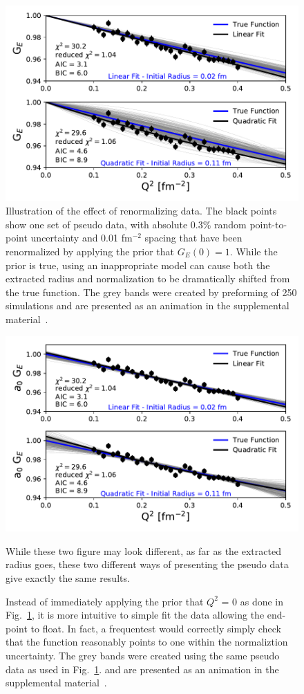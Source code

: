 \documentclass[10pt,superscriptaddress,aps,prc,twocolumn]{revtex4-1}
\begin{document}
\begin{figure}[htb]
\includegraphics[width=\columnwidth]{Figure/linearVSquadratic-band.pdf}
\caption{Illustration of the effect of renormalizing data.  The
black points show one set of pseudo data, with absolute 0.3\% random point-to-point 
uncertainty and 0.01 fm$^{-2}$ spacing that have been renormalized
by applying the prior that $G_E(0)=1$.    While the prior is true, using an inappropriate model
can cause both the extracted radius and normalization to be dramatically shifted from the true
function.   
The grey bands were created by preforming of 250 simulations and are presented as
an animation in the supplemental material~\cite{Supplement}.}
\label{linearVSquadratic}
\end{figure}

\begin{figure}[htb]
\includegraphics[width=\columnwidth]{Figure/frequentist-band.pdf}
\caption{Instead of immediately applying the prior that $Q^2$ = 0 as done in Fig.~\ref{linearVSquadratic}, 
it is more intuitive to simple fit the data allowing the end-point to float.  
In fact, a frequentest would correctly simply check that the function reasonably points to one within
the normaliztion uncertainty.
The grey bands were created using the same pseudo data 
as used in Fig.~\ref{linearVSquadratic}. 
and are presented as
an animation in the supplemental material~\cite{Supplement}. }
While these two figure may look different, as far as the extracted radius goes, 
these two different ways of presenting the pseudo data
give exactly the same results.
\end{figure}
\end{document}
